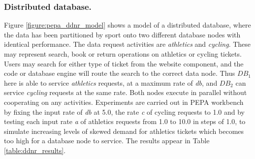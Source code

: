 %
%
\FloatBarrier
\begin{shaded}
\subsubsection{Distributed database.} Figure \ref{figure:pepa_ddnr_model} shows a model of a distributed database, where the data has been partitioned by sport onto two different database nodes with identical performance.  The data request activities are {\itshape athletics} and {\itshape cycling}.  These may represent search, book or return operations on athletics or cycling tickets.  Users may search for either type of ticket from the website component, and the code or database engine will route the search to the correct data node.  Thus $\mathit{DB_1}$ here is able to service {\itshape athletics} requests, at a maximum rate of {\itshape db}, and $\mathit{DB_2}$ can service {\itshape cycling} requests at the same rate.  Both nodes execute in parallel without cooperating on any activities.
Experiments are carried out in PEPA workbench by fixing the input rate of {\itshape db} at 5.0, the rate {\itshape c} of cycling requests to 1.0 and by testing each input rate {\itshape a} of athletics requests from 1.0 to 10.0 in steps of 1.0, to simulate increasing levels of skewed demand for athletics tickets which becomes too high for a database node to service.  The results appear in Table \ref{table:ddnr_results}.
\end{shaded}

